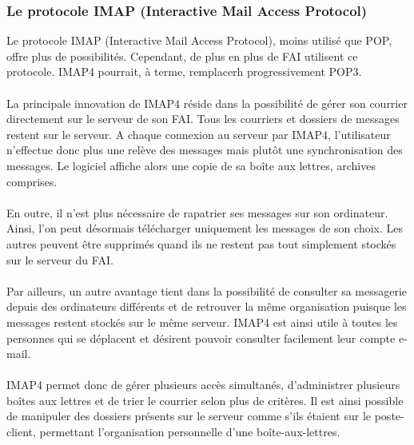\documentclass[french]{report}
\begin{document}
\subsubsection{\LARGE Le protocole IMAP (Interactive Mail Access Protocol)}
\LARGE Le protocole IMAP (Interactive Mail Access Protocol), moins utilisé que POP, offre plus de possibilités. Cependant, de plus en plus de FAI utilisent ce protocole. IMAP4 pourrait, à terme, remplacerh  progressivement POP3.\\ \\
La principale innovation de IMAP4 réside dans la possibilité de gérer son courrier directement sur le serveur de son FAI. Tous les courriers et dossiers de messages restent sur le serveur. A chaque connexion au serveur par IMAP4, l'utilisateur n'effectue donc plus une relève des messages mais plutôt une synchronisation des messages. Le logiciel affiche alors une copie de sa boîte aux lettres, archives comprises.\\ \\
En outre, il n'est plus nécessaire de rapatrier ses messages sur son ordinateur. Ainsi, l'on peut désormais télécharger uniquement les messages de son choix. Les autres peuvent être supprimés quand ils ne restent pas tout simplement stockés sur le serveur du FAI.\\ \\
Par ailleurs, un autre avantage tient dans la possibilité de consulter sa messagerie depuis des ordinateurs différents et de retrouver la même organisation puisque les messages restent stockés sur le même serveur. IMAP4 est ainsi utile à toutes les personnes qui se déplacent et désirent pouvoir consulter facilement leur compte e-mail.\\ \\
IMAP4 permet donc de gérer plusieurs accès simultanés, d'administrer plusieurs boîtes aux lettres et de trier le courrier selon plus de critères. Il est ainsi possible de manipuler des dossiers présents sur le serveur comme s'ils étaient sur le poste-client, permettant l'organisation personnelle d'une boîte-aux-lettres.
\end{document}
